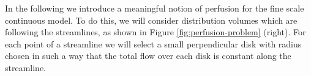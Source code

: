 \documentclass[10pt]{article}
\begin{document}

	In the following we introduce a meaningful notion of perfusion for the fine scale continuous model.
	To do this, we will consider distribution volumes which are following the streamlines, as shown in Figure \ref{fig:perfusion-problem} (right). 	
	For each point of a streamline we will select a small perpendicular disk with radius chosen in such a way that the total flow over each disk is constant along the streamline.
\end{document}
